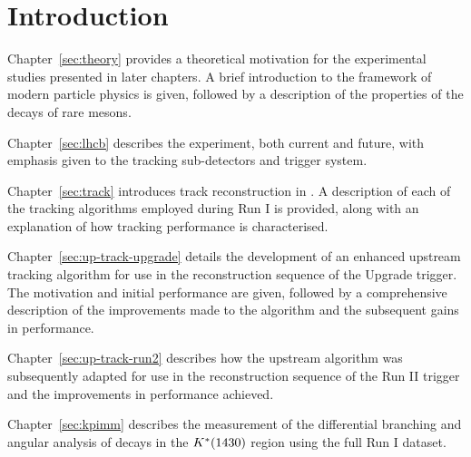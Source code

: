 \section{Introduction}
\label{sec:intro}


Chapter~\ref{sec:theory} provides a theoretical motivation for the experimental studies presented in later chapters. A brief  introduction to the framework of modern particle physics is given, followed by a description of the properties of the decays of rare \B mesons.

Chapter~\ref{sec:lhcb} describes the \lhcb experiment, both current and future, with emphasis given to the tracking sub-detectors and trigger system.

Chapter~\ref{sec:track} introduces track reconstruction in \lhcb. A description of each of the tracking algorithms employed during \lhcb Run I is provided, along with an explanation of how tracking performance is characterised.

Chapter~\ref{sec:up-track-upgrade} details the development of an enhanced upstream tracking algorithm for use in the reconstruction sequence of the \lhcb Upgrade trigger. The motivation and initial performance are given, followed by a comprehensive description of the improvements made to the algorithm and the subsequent gains in performance. 

Chapter~\ref{sec:up-track-run2} describes how the upstream algorithm was subsequently adapted for use in the reconstruction sequence of the \lhcb Run II trigger and the improvements in performance achieved.

Chapter~\ref{sec:kpimm} describes the measurement of the differential branching and angular analysis of \BdToKpimm decays in the ${K}^{*}(1430)$ region using the full \lhcb Run I dataset.